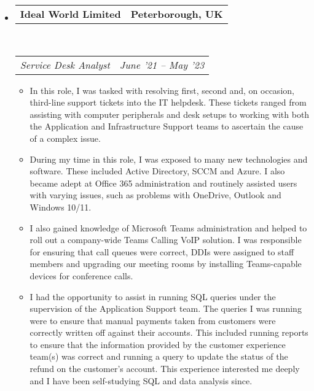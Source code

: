 \documentclass[10pt,a4paper]{article}
\makeatletter
\newcommand{\headerrow}[2]
{\begin{tabular*}{\linewidth}{l@{\extracolsep{\fill}}r}
	#1 &
	#2 \\
\end{tabular*}}
\makeatother
\begin{document}
\begin{itemize}
	\item
	\headerrow
		{\textbf{Ideal World Limited}}
		{\textbf{Peterborough, UK}}
	\\
	\headerrow
		{\emph{Service Desk Analyst}}
		{\emph{June '21 -- May '23}}
	\begin{itemize}
		\item In this role, I was tasked with resolving first, second and, on occasion, third-line support tickets into the IT helpdesk. These tickets ranged from assisting with computer peripherals and desk setups to working with both the Application and Infrastructure Support teams to ascertain the cause of a complex issue.
		\item During my time in this role, I was exposed to many new technologies and software. These included Active Directory, SCCM and Azure. I also became adept at Office 365 administration and routinely assisted users with varying issues, such as problems with OneDrive, Outlook and Windows 10/11.
		\item I also gained knowledge of Microsoft Teams administration and helped to roll out a company-wide Teams Calling VoIP solution. I was responsible for ensuring that call queues were correct, DDIs were assigned to staff members and upgrading our meeting rooms by installing Teams-capable devices for conference calls.
		\item I had the opportunity to assist in running SQL queries under the supervision of the Application Support team. The queries I was running were to ensure that manual payments taken from customers were correctly written off against their accounts. This included running reports to ensure that the information provided by the customer experience team(s) was correct and running a query to update the status of the refund on the customer's account. This experience interested me deeply and I have been self-studying SQL and data analysis since.
	\end{itemize}


\end{itemize}
\end{document}
